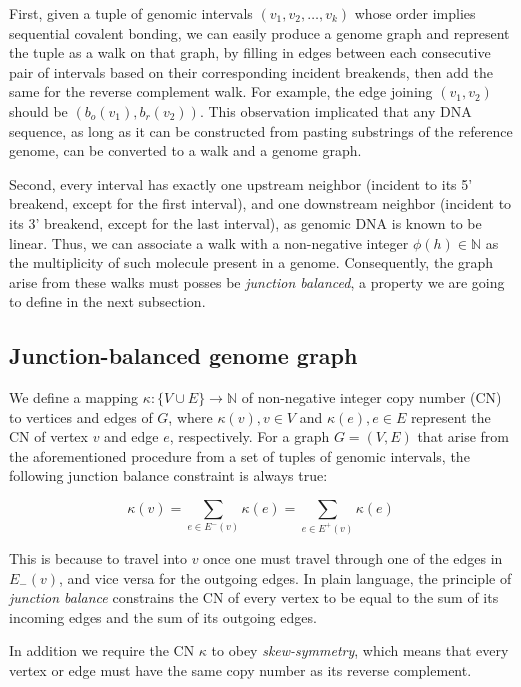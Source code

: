\documentclass[phd,tocprelim]{cornell}
\begin{document}
First, given a tuple of genomic intervals $(v_1, v_2, \dots, v_k)$ whose order implies sequential covalent bonding, we can easily produce a genome graph and represent the tuple as a walk on that graph, by filling in edges between each consecutive pair of intervals based on their corresponding incident breakends, then add the same for the reverse complement walk. For example, the edge joining $(v_1, v_2)$ should be $(b_o(v_1), b_r(v_2))$. This observation implicated that any DNA sequence, as long as it can be constructed from pasting substrings of the reference genome, can be converted to a walk and a genome graph.

Second, every interval has exactly one upstream neighbor (incident to its 5' breakend, except for the first interval), and one downstream neighbor (incident to its 3' breakend, except for the last interval), as genomic DNA is known to be linear. Thus, we can associate a walk with a non-negative integer $\phi(h) \in \mathbb{N}$ as the multiplicity of such molecule present in a genome. Consequently, the graph arise from these walks must posses be \textit{junction balanced}, a property we are going to define in  the next subsection.

\subsection{Junction-balanced genome graph} \label{sub:JBGG}
We define a mapping $\kappa:\{V \cup E\}\rightarrow \mathbb{N}$ of non-negative integer copy number (CN) to vertices and edges of $G$, where $\kappa(v),v \in V$ and  $\kappa(e),e \in E$ represent the CN of vertex $v$ and edge $e$, respectively. For a graph $G = (V, E)$ that arise from the aforementioned procedure from a set of tuples of genomic intervals, the following junction balance constraint is always true:

\begin{equation}
    \label{eq:junction_balance_constraint}
\kappa(v)= \sum_{e\in E^-(v)} \kappa(e) = \sum_{e\in E^+(v)} \kappa(e)
\end{equation}

This is because to travel into $v$ once one must travel through one of the edges in $E_{-}(v)$, and vice versa for the outgoing edges. In plain language, the principle of \textit{junction balance} constrains the CN of every vertex to be equal to the sum of its incoming edges and the sum of its outgoing edges.

In addition we require the CN $\kappa$ to obey \textit{skew-symmetry}, which means that every vertex or edge must have the same copy number as its reverse complement.
\end{document}
